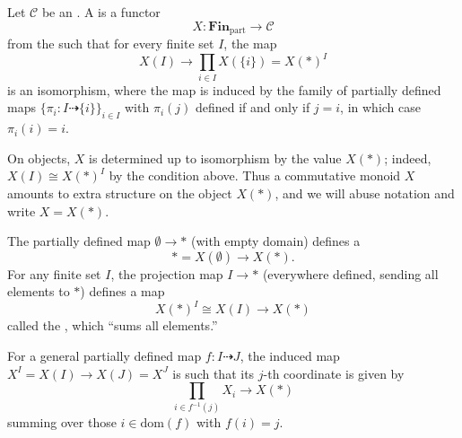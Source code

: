 \begin{definition} \label{definition:commutative_monoid_in_an_infinity_category}
Let $\mathcal{C}$ be an . A  is a functor
\[ X : \mathbf{Fin}_{\mathrm{part}} \to \mathcal{C} \]
from the  such that for every finite set $I$, the map
\[ X(I) \to \prod_{i \in I} X(\{i\}) = X(\ast)^I \]
is an isomorphism, where the map is induced by the family of partially defined maps $\{\pi_i : I \dashrightarrow \{i\}\}_{i \in I}$ with $\pi_i(j)$ defined if and only if $j=i$, in which case $\pi_i(i) = i$.

On objects, $X$ is determined up to isomorphism by the value $X(\ast)$; indeed, $X(I) \cong X(\ast)^I$ by the condition above. Thus a commutative monoid $X$ amounts to extra structure on the object $X(\ast)$, and we will abuse notation and write $X = X(\ast)$.

The partially defined map $\emptyset \to \ast$ (with empty domain) defines a 
\[ \ast = X(\emptyset) \to X(\ast). \]
For any finite set $I$, the projection map $I \to \ast$ (everywhere defined, sending all elements to $\ast$) defines a map
\[ X(\ast)^I \cong X(I) \to X(\ast) \]
called the , which ``sums all elements.''

For a general partially defined map $f : I \dashrightarrow J$, the induced map $X^I = X(I) \to X(J) = X^J$ is such that its $j$-th coordinate is given by
\[ \prod_{i \in f^{-1}(j)} X_i \to X(\ast) \]
summing over those $i \in \mathrm{dom}(f)$ with $f(i) = j$.
\end{definition}
